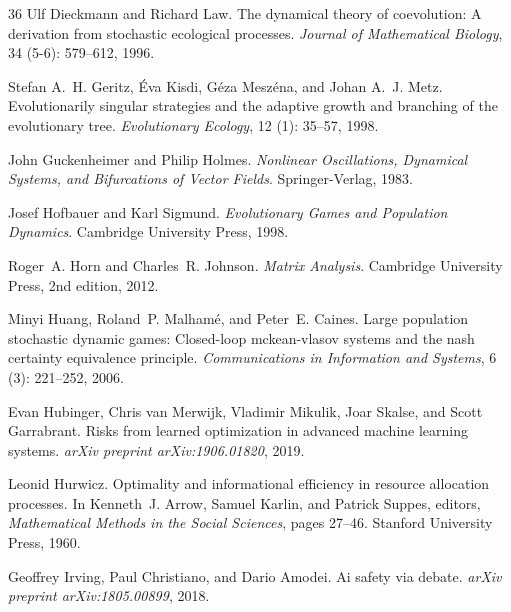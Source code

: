\documentclass[12pt]{article}
\begin{document}
\begin{thebibliography}{36}
Ulf Dieckmann and Richard Law.
\newblock The dynamical theory of coevolution: A derivation from stochastic
  ecological processes.
\newblock \emph{Journal of Mathematical Biology}, 34 (5-6):
  579--612, 1996.

Stefan A.~H. Geritz, {\'E}va Kisdi, G{\'e}za Mesz{\'e}na, and Johan A.~J. Metz.
\newblock Evolutionarily singular strategies and the adaptive growth and
  branching of the evolutionary tree.
\newblock \emph{Evolutionary Ecology}, 12 (1): 35--57, 1998.

John Guckenheimer and Philip Holmes.
\newblock \emph{Nonlinear Oscillations, Dynamical Systems, and Bifurcations of
  Vector Fields}.
\newblock Springer-Verlag, 1983.

Josef Hofbauer and Karl Sigmund.
\newblock \emph{Evolutionary Games and Population Dynamics}.
\newblock Cambridge University Press, 1998.

Roger~A. Horn and Charles~R. Johnson.
\newblock \emph{Matrix Analysis}.
\newblock Cambridge University Press, 2nd edition, 2012.

Minyi Huang, Roland~P. Malham{\'e}, and Peter~E. Caines.
\newblock Large population stochastic dynamic games: Closed-loop mckean-vlasov
  systems and the nash certainty equivalence principle.
\newblock \emph{Communications in Information and Systems}, 6
  (3): 221--252, 2006.

Evan Hubinger, Chris van Merwijk, Vladimir Mikulik, Joar Skalse, and Scott
  Garrabrant.
\newblock Risks from learned optimization in advanced machine learning systems.
\newblock \emph{arXiv preprint arXiv:1906.01820}, 2019.

Leonid Hurwicz.
\newblock Optimality and informational efficiency in resource allocation
  processes.
\newblock In Kenneth~J. Arrow, Samuel Karlin, and Patrick Suppes, editors,
  \emph{Mathematical Methods in the Social Sciences}, pages 27--46. Stanford
  University Press, 1960.

Geoffrey Irving, Paul Christiano, and Dario Amodei.
\newblock Ai safety via debate.
\newblock \emph{arXiv preprint arXiv:1805.00899}, 2018.


\end{thebibliography}
\end{document}
